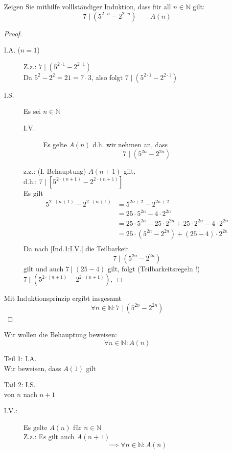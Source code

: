 \documentclass[a4paper, parskip = true, fleqn, headsepline = true]{scrartcl}
\DeclareRobustCommand{\qed}{%
	\ifmmode \tag*{$\Box$}%
	\else \leavevmode\unskip\penalty9999 \hbox{}\nobreak\hfill\quad\hbox{$\Box$}%
	\fi%
}
\newcommand{\N}{\mathbb{N}}
\begin{document}
\begin{task}
	Zeigen Sie mithilfe volllständiger Induktion, dass für all $n \in \N $ gilt:
	\[ 7 \mid \left( 5^{2 \cdot n} - 2^{2 \cdot n} \right) \qquad A(n) \]
	\begin{proof}
		\begin{description}
			\item[I.A. ($n = 1$)] Z.z.: $ 7 \mid \left( 5^{2 \cdot 1} - 2^{2 \cdot 1} \right) $\\
				Da $ 5^2 - 2^2 = 21 = 7 \cdot 3 $, also folgt $ 7 \mid \left( 5^{2 \cdot 1} - 2^{2 \cdot 1} \right) $
			\item[I.S.] Es sei $ n \in \N $
				\begin{description}
					\item[I.V.] \label{Ind.1:I.V.} Es gelte $ A(n) $ d.h. wir nehmen an, dass
						\[ 7 \mid \left( 5^{2n} - 2^{2n} \right) \]
				\end{description}
				z.z.: (I. Behauptung) $ A( n + 1 ) $ gilt,\\
				d.h.: $ 7 \mid \left[ 5^{2 \cdot ( n + 1 )} - 2^{2 \cdot ( n + 1 )} \right] $\\
				Es gilt
				\begin{align*}
					5^{2 \cdot ( n + 1 )} - 2^{2 \cdot ( n + 1 )} &= 5^{2n + 2} - 2^{2n + 2}\\
						~&= 25 \cdot 5^{2n} - 4 \cdot 2^{2n}\\
						~&= 25 \cdot 5^{2n} - 25 \cdot 2^{2n} + 25 \cdot 2^{2n} - 4 \cdot 2^{2n}\\
						~&= 25 \cdot \left( 5^{2n} - 2^{2n} \right) + ( 25 - 4 ) \cdot 2^{2n}\\
				\end{align*}
				Da nach \ref{Ind.1:I.V.} die Teilbarkeit
				\[ 7 \mid \left( 5^{2n} - 2^{2n} \right) \]
				gilt und auch $ 7 \mid (25 - 4) $ gilt, folgt (Teilbarkeitsregeln !) $ 7 \mid \left( 5^{2 \cdot ( n + 1 )} - 2^{2 \cdot ( n + 1 )} \right) $, \qed
		\end{description}
		Mit Induktionsprinzip ergibt insgesamt
		\[ \forall n \in \N : 7 \mid \left( 5^{2n} - 2^{2n} \right) \]
	\end{proof}
\end{task}

\begin{definition}
	Wir wollen die Behauptung beweisen:
	\[ \forall n \in \N : A(n) \]\par
	Teil 1: I.A.\\
	Wir beweisen, dass $ A(1) $ gilt\par
	Tail 2: I.S.\\
	von $ n $ nach $ n + 1 $
	\begin{description}
		\item[I.V.:] Es gelte $ A(n) $ für $ n \in \N $\\
			Z.z.: Es gilt auch $ A( n + 1 ) $
			\[ \implies \forall n \in \N : A(n) \]
	\end{description}
\end{definition}
\end{document}
